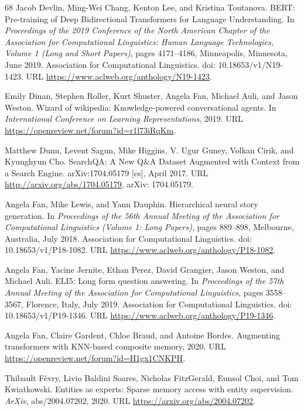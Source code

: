 \documentclass[10pt,letterpaper]{article}
\begin{document}
{\begin{thebibliography}{68}
 Jacob Devlin, Ming-Wei Chang, Kenton Lee, and Kristina Toutanova.
BERT: Pre-training of Deep Bidirectional Transformers for Language
Understanding. In \emph{Proceedings of the 2019 Conference of the North American
Chapter of the Association for Computational Linguistics: Human Language
Technologies, Volume 1 (Long and Short Papers)}, pages 4171--4186, Minneapolis,
Minnesota, June 2019. Association for Computational Linguistics. doi:
10.18653/v1/N19-1423. URL \url{https://www.aclweb.org/anthology/N19-1423}.

 Emily Dinan, Stephen Roller, Kurt Shuster, Angela Fan, Michael
Auli, and Jason Weston. Wizard of wikipedia: Knowledge-powered conversational
agents. In \emph{International Conference on Learning Representations}, 2019.
URL \url{https://openreview.net/forum?id=r1l73iRqKm}.

 Matthew Dunn, Levent Sagun, Mike Higgins, V. Ugur Guney, Volkan
Cirik, and Kyunghyun Cho. SearchQA: A New Q\&A Dataset Augmented with Context
from a Search Engine. arXiv:1704.05179 [cs], April 2017. URL
\url{http://arxiv.org/abs/1704.05179}. arXiv: 1704.05179.

 Angela Fan, Mike Lewis, and Yann Dauphin. Hierarchical neural
story generation. In \emph{Proceedings of the 56th Annual Meeting of the
Association for Computational Linguistics (Volume 1: Long Papers)}, pages
889--898, Melbourne, Australia, July 2018. Association for Computational
Linguistics. doi: 10.18653/v1/P18-1082. URL
\url{https://www.aclweb.org/anthology/P18-1082}.

 Angela Fan, Yacine Jernite, Ethan Perez, David Grangier, Jason
Weston, and Michael Auli. ELI5: Long form question answering. In
\emph{Proceedings of the 57th Annual Meeting of the Association for
Computational Linguistics}, pages 3558--3567, Florence, Italy, July 2019.
Association for Computational Linguistics. doi: 10.18653/v1/P19-1346. URL
\url{https://www.aclweb.org/anthology/P19-1346}.

 Angela Fan, Claire Gardent, Chloe Braud, and Antoine Bordes.
Augmenting transformers with KNN-based composite memory, 2020. URL
\url{https://openreview.net/forum?id=H1gx1CNKPH}.

 Thibault Févry, Livio Baldini Soares, Nicholas FitzGerald, Eunsol
Choi, and Tom Kwiatkowski. Entities as experts: Sparse memory access with
entity supervision. \emph{ArXiv}, abs/2004.07202, 2020. URL
\url{https://arxiv.org/abs/2004.07202}.


\end{thebibliography}}
\end{document}
